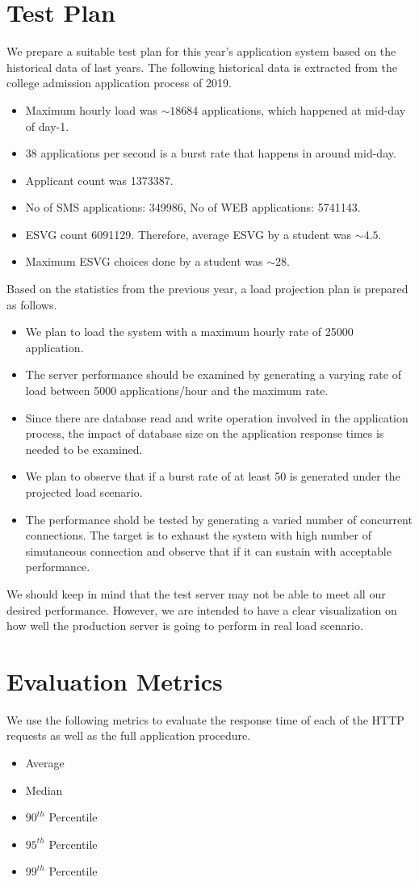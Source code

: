 \documentclass[sigconf,authordraft]{acmart}
\begin{document}
\section{Test Plan}
We prepare a suitable test plan for this year's application system based on the historical data of last years. The following historical data is extracted from the college admission application process of 2019.
\begin{itemize}
	\item Maximum hourly load was $\sim 18684$ applications, which happened at mid-day of day-1.
	\item 38 applications per second is a burst rate that happens in around mid-day.
	\item Applicant count was 1373387.
	\item No of SMS applications: 349986, No of WEB applications: 5741143. 
	\item ESVG count 6091129. Therefore, average ESVG by a student was $\sim 4.5$.
	\item Maximum ESVG choices done by a student was $\sim 28$.
\end{itemize}
Based on the statistics from the previous year, a load projection plan is prepared as follows.
\begin{itemize}
	\item We plan to load the system with a maximum hourly rate of 25000 application.
	\item The server performance should be examined by generating a varying rate of load between 5000 applications/hour and the maximum rate.
	\item Since there are database read and write operation involved in the application process, the impact of database size on the application response times is needed to be examined.
	\item We plan to observe that if a burst rate of at least 50 is generated under the projected load scenario.
	\item The performance shold be tested by generating a varied number of concurrent connections. The target is to exhaust the system with high number of simutaneous connection and observe that if it can sustain with acceptable performance.
\end{itemize}
We should keep in mind that the test server may not be able to meet all our desired performance. However, we are intended to have a clear visualization on how well the production server is going to perform in real load scenario.

\section{Evaluation Metrics}
We use the following metrics to evaluate the response time of each of the HTTP requests as well as the full application procedure. 
\begin{itemize}
	\item Average
	\item Median
	\item $90^{th}$ Percentile
	\item $95^{th}$ Percentile
	\item $99^{th}$ Percentile
\end{itemize}
\end{document}
